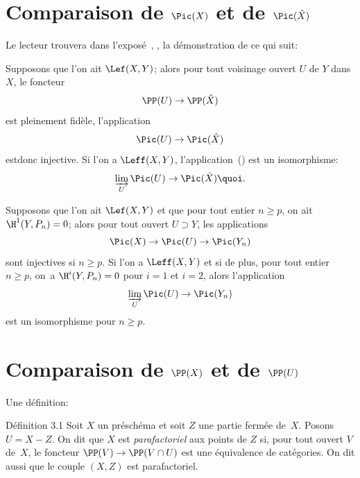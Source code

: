 \section{Comparaison de $\Pic(X)$ et de $\Pic(\hat X)$} \label{XI.2}

Le lecteur trouvera dans l'expos\'e~, \numero {}, la d\'emonstration de ce qui suit:

\begin{proposition} \label{XI.2.1} Supposons que l'on ait $\Lef(X, Y)$; alors pour tout voisinage ouvert $U$ de $Y$ dans $X$, le foncteur
\begin{equation} \label{eq:XI.2.1} \PP(U)\to\PP(\hat X)
\end{equation}
est pleinement fid\`ele, l'application
\begin{equation} \label{eq:XI.2.2} \Pic(U)\to\Pic(\hat X)
\end{equation}
est\pageoriginale donc injective. Si l'on a $\Leff(X, Y)$, l'application~() est un isomorphisme:
\begin{equation} \label{eq:XI.2.3}
\varinjlim_U\Pic(U)\to\Pic(\hat X){\quoi}.
\end{equation}
\end{proposition}

\begin{corollaire} \label{XI.2.2} Supposons que l'on ait $\Lef(X, Y)$ et que pour tout entier $n\geq p$, on ait $\H^1(Y, P_n)=0$; alors pour tout ouvert $U\supset Y$, les applications
\[
\Pic(X)\to\Pic(U)\to\Pic(Y_n)
\]
sont injectives si $n\geq p$. Si l'on a $\Leff(X, Y)$ et si de plus, pour tout entier $n\geq p$, on~a $\H^i(Y, P_n)=0$ pour $i=1$ et $i=2$, alors l'application
\[
\varinjlim_U\Pic(U)\to\Pic(Y_n)
\]
est un isomorphisme pour $n\geq p$.
\end{corollaire}

\section{Comparaison de $\PP(X)$ et de $\PP(U)$} \label{XI.3}

Une d\'efinition:
\label{XI.3.1}
\begin{enonce*}[remark]{D\'efinition 3.1\sfootnotemark}
Soit $X$ un pr\'esch\'ema et soit $Z$ une partie ferm\'ee de~$X$. Posons $U=X-Z$. On dit que $X$ est \emph{parafactoriel} aux points de $Z$ si, pour tout ouvert $V$ de~$X$, le foncteur $\PP(V)\to \PP(V\cap U)$ est une \'equivalence de cat\'egories. On dit aussi que le couple $(X, Z)$ est parafactoriel.
\end{enonce*}

